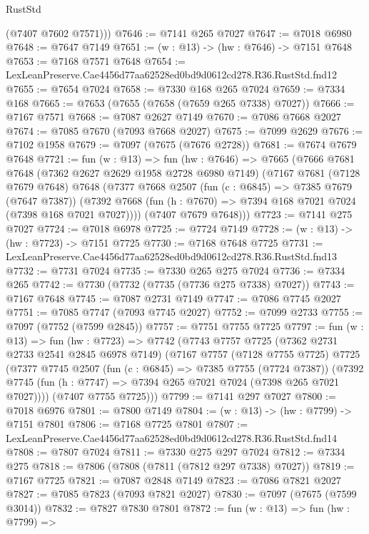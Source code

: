 \begin{lexlean}{RustStd}
\begin{coremodule}
        (@7407 @7602 @7571)))
@7646 := @7141 @265 @7027
@7647 := @7018 @6980
@7648 := @7647 @7149
@7651 := (w : @13) -> (hw : @7646) -> @7151 @7648
@7653 := @7168 @7571 @7648
@7654 := LexLeanPreserve.Cae4456d77aa62528ed0bd9d0612cd278.R36.RustStd.fnd12
@7655 := @7654 @7024
@7658 := @7330 @168 @265 @7024
@7659 := @7334 @168
@7665 := @7653 (@7655 (@7658 (@7659 @265 @7338) @7027))
@7666 := @7167 @7571
@7668 := @7087 @2627 @7149
@7670 := @7086 @7668 @2027
@7674 := @7085 @7670 (@7093 @7668 @2027)
@7675 := @7099 @2629
@7676 := @7102 @1958
@7679 := @7097 (@7675 (@7676 @2728))
@7681 := @7674 @7679 @7648
@7721 := fun (w : @13) =>
  fun (hw : @7646) =>
  @7665
    (@7666
      @7681
      @7648
      (@7362 @2627 @2629 @1958 @2728 @6980 @7149)
      (@7167
        @7681
        (@7128 @7679 @7648)
        @7648
        (@7377
          @7668
          @2507
          (fun (c : @6845) => @7385 @7679 (@7647 @7387))
          (@7392 @7668 (fun (h : @7670) => @7394 @168 @7021 @7024 (@7398 @168 @7021 @7027))))
        (@7407 @7679 @7648)))
@7723 := @7141 @275 @7027
@7724 := @7018 @6978
@7725 := @7724 @7149
@7728 := (w : @13) -> (hw : @7723) -> @7151 @7725
@7730 := @7168 @7648 @7725
@7731 := LexLeanPreserve.Cae4456d77aa62528ed0bd9d0612cd278.R36.RustStd.fnd13
@7732 := @7731 @7024
@7735 := @7330 @265 @275 @7024
@7736 := @7334 @265
@7742 := @7730 (@7732 (@7735 (@7736 @275 @7338) @7027))
@7743 := @7167 @7648
@7745 := @7087 @2731 @7149
@7747 := @7086 @7745 @2027
@7751 := @7085 @7747 (@7093 @7745 @2027)
@7752 := @7099 @2733
@7755 := @7097 (@7752 (@7599 @2845))
@7757 := @7751 @7755 @7725
@7797 := fun (w : @13) =>
  fun (hw : @7723) =>
  @7742
    (@7743
      @7757
      @7725
      (@7362 @2731 @2733 @2541 @2845 @6978 @7149)
      (@7167
        @7757
        (@7128 @7755 @7725)
        @7725
        (@7377
          @7745
          @2507
          (fun (c : @6845) => @7385 @7755 (@7724 @7387))
          (@7392 @7745 (fun (h : @7747) => @7394 @265 @7021 @7024 (@7398 @265 @7021 @7027))))
        (@7407 @7755 @7725)))
@7799 := @7141 @297 @7027
@7800 := @7018 @6976
@7801 := @7800 @7149
@7804 := (w : @13) -> (hw : @7799) -> @7151 @7801
@7806 := @7168 @7725 @7801
@7807 := LexLeanPreserve.Cae4456d77aa62528ed0bd9d0612cd278.R36.RustStd.fnd14
@7808 := @7807 @7024
@7811 := @7330 @275 @297 @7024
@7812 := @7334 @275
@7818 := @7806 (@7808 (@7811 (@7812 @297 @7338) @7027))
@7819 := @7167 @7725
@7821 := @7087 @2848 @7149
@7823 := @7086 @7821 @2027
@7827 := @7085 @7823 (@7093 @7821 @2027)
@7830 := @7097 (@7675 (@7599 @3014))
@7832 := @7827 @7830 @7801
@7872 := fun (w : @13) =>
  fun (hw : @7799) =>

\end{coremodule}
\end{lexlean}
